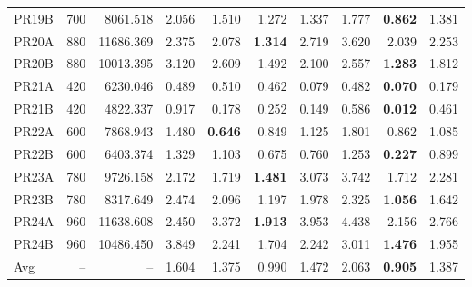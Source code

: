\begin{tabular}{@{}lrrrrrrrrr@{}}
PR19B & 700 & 8061.518 & 2.056 & 1.510 & 1.272 & 1.337 & 1.777 & \textbf{0.862} & 1.381 \\
PR20A & 880 & 11686.369 & 2.375 & 2.078 & \textbf{1.314} & 2.719 & 3.620 & 2.039 & 2.253 \\
PR20B & 880 & 10013.395 & 3.120 & 2.609 & 1.492 & 2.100 & 2.557 & \textbf{1.283} & 1.812 \\
PR21A & 420 & 6230.046 & 0.489 & 0.510 & 0.462 & 0.079 & 0.482 & \textbf{0.070} & 0.179 \\
PR21B & 420 & 4822.337 & 0.917 & 0.178 & 0.252 & 0.149 & 0.586 & \textbf{0.012} & 0.461 \\
PR22A & 600 & 7868.943 & 1.480 & \textbf{0.646} & 0.849 & 1.125 & 1.801 & 0.862 & 1.085 \\
PR22B & 600 & 6403.374 & 1.329 & 1.103 & 0.675 & 0.760 & 1.253 & \textbf{0.227} & 0.899 \\
PR23A & 780 & 9726.158 & 2.172 & 1.719 & \textbf{1.481} & 3.073 & 3.742 & 1.712 & 2.281 \\
PR23B & 780 & 8317.649 & 2.474 & 2.096 & 1.197 & 1.978 & 2.325 & \textbf{1.056} & 1.642 \\
PR24A & 960 & 11638.608 & 2.450 & 3.372 & \textbf{1.913} & 3.953 & 4.438 & 2.156 & 2.766 \\
PR24B & 960 & 10486.450 & 3.849 & 2.241 & 1.704 & 2.242 & 3.011 & \textbf{1.476} & 1.955 \\
Avg & -- & -- & 1.604 & 1.375 & 0.990 & 1.472 & 2.063 & \textbf{0.905} & 1.387 \\
\bottomrule
\end{tabular}
